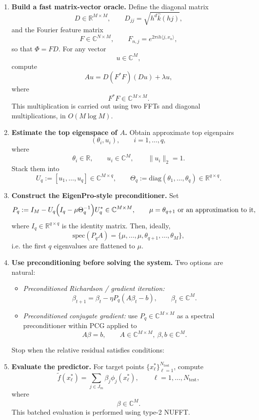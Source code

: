 \documentclass{article}
\begin{document}
\begin{enumerate}
    \item \textbf{Build a fast matrix-vector oracle.}  
    Define the diagonal matrix
    \[
    D\in\mathbb{R}^{M\times M},
    \qquad
    D_{jj}=\sqrt{h^d\widehat{k}(hj)},
    \]
    and the Fourier feature matrix
    \[
    F\in\mathbb{C}^{N\times M},
    \qquad
    F_{n,j}=e^{2\pi i h\langle j,x_n\rangle},
    \]
    so that \(\Phi=FD\).  
    For any vector
    \[
    u\in\mathbb{C}^M,
    \]
    compute
    \[
    Au = D(F^*F)(Du)+\lambda u,
    \]
    where
    \[
    F^*F\in\mathbb{C}^{M\times M}.
    \]
    This multiplication is carried out using two FFTs and diagonal multiplications, in \(O(M\log M)\).

    \item \textbf{Estimate the top eigenspace of \(A\).}  
    Obtain approximate top eigenpairs
    \[
    (\theta_i,u_i),\qquad i=1,\dots,q,
    \]
    where
    \[
    \theta_i\in\mathbb{R},\qquad u_i\in\mathbb{C}^M,\qquad \|u_i\|_2=1.
    \]
    Stack them into
    \[
    U_q:=[u_1,\dots,u_q]\in\mathbb{C}^{M\times q},
    \qquad
    \Theta_q:=\mathrm{diag}(\theta_1,\dots,\theta_q)\in\mathbb{R}^{q\times q}.
    \]

    \item \textbf{Construct the EigenPro-style preconditioner.}  
    Set
    \[
    P_q
    :=
    I_M-U_q\Bigl(I_q-\mu\Theta_q^{-1}\Bigr)U_q^*
    \in\mathbb{C}^{M\times M},
    \qquad
    \mu=\theta_{q+1}\ \text{or an approximation to it},
    \]
    where \(I_q\in\mathbb{R}^{q\times q}\) is the identity matrix.  
    Then, ideally,
    \[
    \mathrm{spec}(P_qA)=\{\mu,\dots,\mu,\theta_{q+1},\dots,\theta_M\},
    \]
    i.e. the first \(q\) eigenvalues are flattened to \(\mu\).

    \item \textbf{Use preconditioning before solving the system.}  
    Two options are natural:
    \begin{itemize}
        \item \emph{Preconditioned Richardson / gradient iteration:}
        \[
        \beta_{t+1}=\beta_t-\eta P_q(A\beta_t-b),
        \qquad
        \beta_t\in\mathbb{C}^M.
        \]
        \item \emph{Preconditioned conjugate gradient:} use \(P_q\in\mathbb{C}^{M\times M}\) as a spectral preconditioner within PCG applied to
        \[
        A\beta=b,
        \qquad
        A\in\mathbb{C}^{M\times M},\ \beta,b\in\mathbb{C}^M.
        \]
    \end{itemize}
    Stop when the relative residual satisfies conditions:

    \item \textbf{Evaluate the predictor.}  
    For target points \(\{x_\ell^*\}_{\ell=1}^{N_{\mathrm{test}}}\), compute
    \[
    \widetilde{f}(x_\ell^*)=\sum_{j\in J_m}\beta_j\phi_j(x_\ell^*),
    \qquad \ell=1,\dots,N_{\mathrm{test}},
    \]
    where
    \[
    \beta\in\mathbb{C}^{M}.
    \]
    This batched evaluation is performed using type-2 NUFFT.
\end{enumerate}
\end{document}
